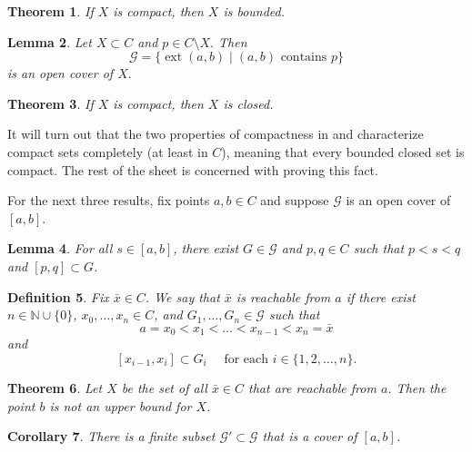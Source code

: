 \documentclass{amsart}
\newtheorem{theorem}{Theorem}
\newtheorem{lemma}[theorem]{Lemma}
\newtheorem{definition}[theorem]{Definition}
\newtheorem{corollary}[theorem]{Corollary}
\newcommand{\N}{\mathbb N}
\newcommand{\1}{\mathds{1}}
\DeclareMathOperator{\ext}{ext}
\def \N {{\mathbb {N}}}
\numberwithin{equation}{section}
\numberwithin{theorem}{section}
\begin{document}
\begin{theorem}  \label{compactimpliesbounded} If $X$ is compact, then $X$ is bounded.
\end{theorem}


\begin{lemma}   Let $X\subset C$ and $p\in C\setminus X.$ Then
\[
\mathcal{G} = \{ \ext(a,b) \mid (a,b) \text{ contains } p  \}
\]
is an open cover of $X.$ 
\end{lemma}



\begin{theorem} \label{compactimpliesclosed} If $X$ is compact, then $X$ is closed.
\end{theorem}

It will turn out that the two properties of compactness in  and  characterize compact sets completely (at least in $C$), meaning that every bounded closed set is compact.  The rest of the sheet is concerned with proving this fact.


\newcommand\cG{\mathcal G}

For the next three results, fix points $a,b\in C$ and suppose $\cG$ is an open cover of $[a,b]$.

\begin{lemma}
\label{lem2}
For all $s\in[a,b]$, there exist $G\in\cG$ and $p,q\in C$ such that $p<s<q$ and $[p,q]\subset G$.
\end{lemma}



\begin{definition}
	Fix $\bar x \in C$.  We say that $\bar x$ is \emph{reachable from $a$} if there exist $n\in\N\cup\{0\}$, $x_0,\ldots,x_n\in C$, and $G_1,\ldots,G_n\in\cG$ such that 
	\[
		a=x_0<x_1<\ldots<x_{n-1}<x_n=\bar x
	\]
	and
	\[
		[x_{i-1},x_i]\subset G_i
			\quad\text{ for each } i \in \{1,2,\dots, n\}.
	\]
\end{definition}



\begin{theorem}
Let $X$ be the set of all $\bar x\in C$ that are \emph{reachable from $a$}.  Then the point $b$ is not an upper bound for $X$.
%
\end{theorem}

\begin{corollary}
There is a finite subset $\cG'\subset\cG$ that is a cover of $[a,b]$.
\end{corollary}
\end{document}
